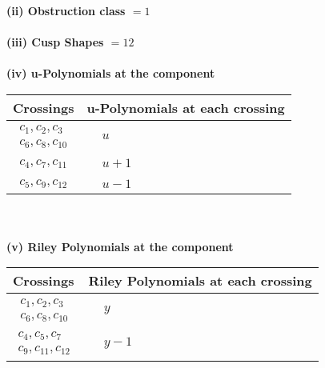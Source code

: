 \documentclass[1p]{elsarticle_modified}
\theoremstyle{definition}
\begin{document}
\flushleft \textbf{(ii) Obstruction class $= 1$}\\~\\
\flushleft \textbf{(iii) Cusp Shapes $= 12$}\\~\\
\newpage\renewcommand{\arraystretch}{1}
\flushleft \textbf{(iv) u-Polynomials at the component}\newline \\
\begin{tabular}{m{50pt}|m{274pt}}
Crossings & \hspace{64pt}u-Polynomials at each crossing \\
\hline $$\begin{aligned}c_{1},c_{2},c_{3}\\c_{6},c_{8},c_{10}\end{aligned}$$&$\begin{aligned}
&u
\end{aligned}$\\
\hline $$\begin{aligned}c_{4},c_{7},c_{11}\end{aligned}$$&$\begin{aligned}
&u+1
\end{aligned}$\\
\hline $$\begin{aligned}c_{5},c_{9},c_{12}\end{aligned}$$&$\begin{aligned}
&u-1
\end{aligned}$\\
\hline
\end{tabular}\\~\\
\newpage\renewcommand{\arraystretch}{1}
\flushleft \textbf{(v) Riley Polynomials at the component}\newline \\
\begin{tabular}{m{50pt}|m{274pt}}
Crossings & \hspace{64pt}Riley Polynomials at each crossing \\
\hline $$\begin{aligned}c_{1},c_{2},c_{3}\\c_{6},c_{8},c_{10}\end{aligned}$$&$\begin{aligned}
&y
\end{aligned}$\\
\hline $$\begin{aligned}c_{4},c_{5},c_{7}\\c_{9},c_{11},c_{12}\end{aligned}$$&$\begin{aligned}
&y-1
\end{aligned}$\\
\hline
\end{tabular}\\~\\
\end{document}
